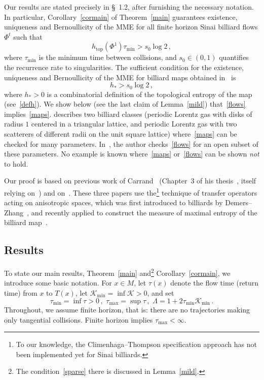 \documentclass[AHL,Unicode,longabstracts,published]{cedram}
\newcommand{\cK}{\mathcal{K}}
\newcommand{\htop}{h_{\scriptstyle{\text{top}}}}
\newcommand{\htop}{h_{\scriptstyle{\text{top}}}}
\begin{document}
Our results are stated precisely in \S~1.2, after furnishing the necessary notation. In particular, Corollary~\ref{cormain} of Theorem~\ref{main} guarantees existence, uniqueness and Bernoullicity of the MME for all finite horizon Sinai billiard flows $\Phi^t$ such that
\begin{equation}\label{flows}
\htop\left(\Phi^1\right) \tau_{\min} > s_0 \log 2\,,
\end{equation}
where $\tau_{\min}$ is the minimum time between collisions, and $s_0\in (0,1)$ quantifies the recurrence rate to singularities. The sufficient condition for the existence, uniqueness and Bernoullicity of the MME for billiard maps obtained in~\cite{BD1} is
\begin{equation}\label{maps}
h_* > s_0 \log2\,,
\end{equation}
where $h_*>0$ is a combinatorial definition of the topological entropy of the map (see~\eqref{defh}). We show below (see the last claim of Lemma~\ref{mild}) that~\eqref{flows} implies~\eqref{maps}. \cite[Section~2.4]{BD1} describes two billiard classes (periodic Lorentz gas with disks of radius $1$ centered in a triangular lattice, and periodic Lorentz gas with two scatterers of different radii on the unit square lattice) where~\eqref{maps} can be checked for many parameters. In~\cite[Remark~5.6]{Ca}, the author checks~\eqref{flows} for an open subset of these parameters. No example is known where~\eqref{maps} or~\eqref{flows} can be shown \emph{not} to hold.


Our proof is based on previous work of Carrand~\cite{Ca} (Chapter~3 of his thesis~\cite{Ca0}, itself relying on~\cite{BD1}) and on~\cite{BD2}. These three papers use the\footnote{To our knowledge, the Climenhaga--Thompson specification approach has not been implemented yet for Sinai billiards.} technique of transfer operators acting on anisotropic spaces, which was first introduced to billiards by Demers--Zhang~\cite{DZ1}, and recently applied to construct the measure of maximal entropy of the billiard map~\cite{BD1}.



\subsection{Results}

To state our main results, Theorem~\ref{main} and\footnote{The condition~\eqref{sparse} there is discussed in Lemma~\ref{mild}.} Corollary~\ref{cormain}, we introduce some basic notation. For $x \in M$, let $\tau(x)$ denote the flow time (return time) from $x$ to $T(x)$, let $\cK_{\min}=\inf \cK>0$, and set
\[
\tau_{\min}=\inf \tau>0\,, \,\, \tau_{\max}=\sup \tau\,,\,\,
\Lambda = 1 + 2 \tau_{\min} \cK_{\min}\,.
\]
Throughout, we assume finite horizon, that is: there are no trajectories making only tangential collisions. Finite horizon implies $\tau_{\max}<\infty$.
\end{document}
